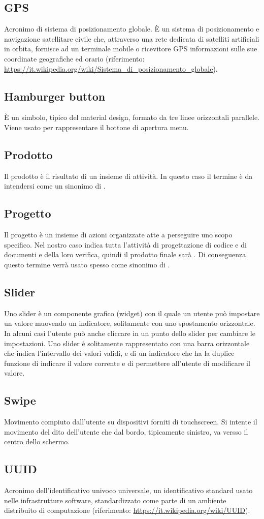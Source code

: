 \subsection{GPS}
Acronimo di sistema di posizionamento globale. È un sistema di posizionamento e navigazione satellitare civile che, attraverso una rete dedicata di satelliti artificiali in orbita, fornisce ad un terminale mobile o ricevitore GPS informazioni sulle sue coordinate geografiche ed orario (riferimento: \url{https://it.wikipedia.org/wiki/Sistema_di_posizionamento_globale}).
\subsection{Hamburger button}
È un simbolo, tipico del material design, formato da tre linee orizzontali parallele. Viene usato per rappresentare il bottone di apertura menu.
\subsection{Prodotto}
Il prodotto è il risultato di un insieme di attività. In questo caso il termine è da intendersi come un sinonimo di \PROGETTO.
\subsection{Progetto}
Il progetto è un insieme di azioni organizzate atte a perseguire uno scopo specifico. Nel nostro caso indica tutta l'attività di progettazione di codice e di documenti e della loro verifica, quindi il prodotto finale sarà \PROGETTO. Di conseguenza questo termine verrà usato spesso come sinonimo di .
\subsection{Slider}
Uno slider è un componente grafico (widget) con il quale un utente può impostare un valore muovendo un indicatore, solitamente con uno spostamento orizzontale. In alcuni casi l'utente può anche cliccare in un punto dello slider per cambiare le impostazioni.
Uno slider è solitamente rappresentato con una barra orizzontale che indica l'intervallo dei valori validi, e di un indicatore che ha la duplice funzione di indicare il valore corrente e di permettere all'utente di modificare il valore.
\subsection{Swipe}
Movimento compiuto dall'utente su dispositivi forniti di touchscreen. Si intente il movimento del dito dell'utente che dal bordo, tipicamente sinistro, va versso il centro dello schermo.
\subsection{UUID}
Acronimo dell'identificativo univoco universale, un identificativo standard usato nelle infrastrutture software, standardizzato come parte di un ambiente distribuito di computazione (riferimento: \url{https://it.wikipedia.org/wiki/UUID}).